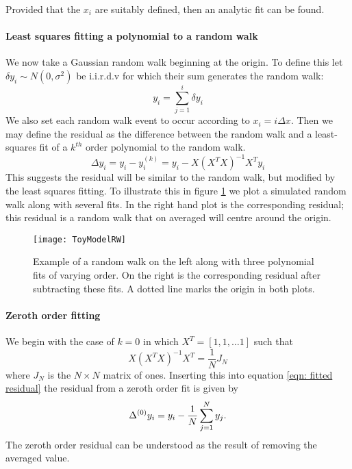 Provided that the $x_{i}$ are suitably defined, then an analytic fit can be 
found.

\paragraph{Least squares fitting a polynomial to a random walk}
We now take a Gaussian random walk beginning at the origin. To define this let
$\delta y_{i} \sim N(0, \sigma^{2})$ be i.i.r.d.v for which their sum generates
the random walk:
\begin{equation}
y_{i} = \sum_{j=1}^{i}\delta y_{i}
\label{eqn: ToyModel RW definition}
\end{equation}
We also set each random walk event to occur according to $x_{i} = i \Delta
x$. Then we may define the
residual as the difference between the random walk and a least-squares fit of a
$k^{th}$ order polynomial to the random walk. 
\begin{equation}
\Delta y_{i} = y_{i} - y_{i}^{(k)} = y_{i} - X \left(X^{T}X\right)^{-1} X^{T} y_{i}
\label{eqn: fitted residual}
\end{equation}
This suggests the residual will be similar to the random walk, but modified by
the least squares fitting.  To illustrate this in figure \ref{fig: ToyModelRW}
we plot a simulated random walk along with several fits. In the right hand plot
is the corresponding residual; this residual is a random walk that on averaged
will centre around the origin.
\begin{figure}[htb]
\centering
\texttt{[image: ToyModelRW]}
\caption{Example of a random walk on the left along with three polynomial fits
of varying order. On the right is the corresponding residual after subtracting
these fits. A dotted line marks the origin in both plots.}
\label{fig: ToyModelRW}
\end{figure}

\paragraph{Zeroth order fitting}

We begin with the case of $k=0$ in which $X^{T} = [1, 1, \dots 1]$ such
that 
\begin{equation}
X \left(X^{T}X\right)^{-1} X^{T} = \frac{1}{N} J_{N}
\end{equation}
where $J_{N}$ is the $N\times N$ matrix of ones.  Inserting this into equation
\eqref{eqn: fitted residual} the residual from a zeroth order fit is given by 
\begin{equation}
\Delta^{(0)}  y_{i}= y_{i} - \frac{1}{N} \sum_{j=1}^{N}y_{j}.
\end{equation}
The zeroth order residual can be understood as the result of removing the
averaged value. 

